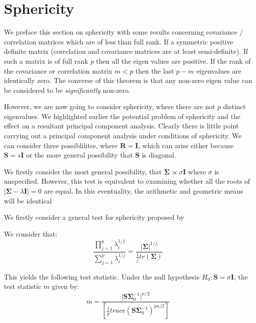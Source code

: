

\section{Sphericity}
\label{Sphericity}

We preface this section on sphericity with some results concerning covariance / correlation matrices which are of less than full rank.   If a symmetric positive definite matrix (correlation and covariance matrices are at least semi-definite).   If such a matrix is of full rank $p$ then all the eigen values are positive.   
If the rank of the covariance or correlation matrix $m < p$ then the last $p-m$ eigenvalues are identically zero.   The converse of this theorem is that any non-zero eigen value can be considered to be \emph{significantly} non-zero.

However, we are now going to consider sphericity, where there are not $p$ distinct eigenvalues.   We highlighted earlier the potential problem of sphericity and the effect on a resultant principal component analysis.
Clearly there is little point carrying out a principal component analysis under conditions of sphericity.   We can consider three possiblilites, where $\boldsymbol{R} = \boldsymbol{I}$, which can arise either because $\boldsymbol{S} = s \boldsymbol{I}$ or the more general possibility that $\boldsymbol{S}$ is diagonal.


We firstly consider the most general possibility, that $\boldsymbol{\Sigma} \propto \sigma \boldsymbol{I}$ where $\sigma$ is unspecified.   However, this test is equivalent to examining whether all the roots of $|\boldsymbol{\Sigma} - \lambda \boldsymbol{I}| = 0$ are equal.   In this eventuality, the arithmetic and geometric means will be identical

We firstly consider a general test for sphericity proposed by \cite{Mauchly:1940}


\begin{theorem}
We consider that:
\label{th:sphericity}
\begin{displaymath}
\frac{\prod_{j=1}^{p} \lambda_{i}^{1/j}}{\sum_{j=1}^{p} \lambda_{i}^{1/j}} = \frac{\lvert \boldsymbol{\Sigma} \rvert^{1/j}}{\frac{1}{j} tr(\boldsymbol{\Sigma})}
\end{displaymath}

This yields the following test statistic.   Under the null hypothesis $H_{0}: \boldsymbol{S} = \sigma \boldsymbol{I}$, the test statistic $m$ given by:
\begin{equation}
m = \frac{\lvert \boldsymbol{S} \boldsymbol{\Sigma}_{0}^{-1} \rvert^{n/2}}
{ \left[ \frac{1}{p} trace(\boldsymbol{S} \boldsymbol{\Sigma}_{0}^{-1} )^{pn/2} \right] } 
\end{equation}
\end{theorem}


